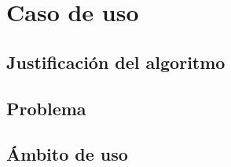 \chapter{Caso de uso}
\label{caso_de_uso}

\section{Justificación del algoritmo}
\label{justificacion}


\section{Problema}
\label{problema}


\section{Ámbito de uso}
\label{ambito}

